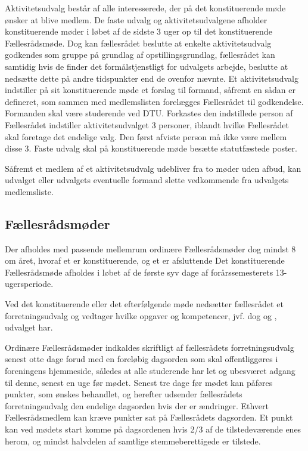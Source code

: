 \begin{list}
\item Aktivitetsudvalg består af alle interesserede, der på det konstituerende møde ønsker at blive medlem. De faste udvalg og aktivitetsudvalgene afholder konstituerende møder i løbet af de sidste 3 uger op til det konstituerende Fællesrådsmøde. Dog kan fællesrådet beslutte at enkelte aktivitetsudvalg godkendes som gruppe på grundlag af opstillingsgrundlag, fællesrådet kan samtidig hvis de finder det formålstjenstligt for udvalgets arbejde, beslutte at nedsætte dette på andre tidspunkter end de ovenfor nævnte. Et aktivitetsudvalg indstiller på sit konstituerende møde et forslag til formand, såfremt en sådan er defineret, som sammen med medlemslisten forelægges Fællesrådet til godkendelse. Formanden skal være studerende ved DTU. Forkastes den indstillede person af Fællesrådet indstiller aktivitetsudvalget 3 personer, iblandt hvilke Fællesrådet skal foretage det endelige valg. Den først afviste person må ikke være mellem disse 3. Faste udvalg skal på konstituerende møde besætte statutfæstede poster.

\item  Såfremt et medlem af et aktivitetsudvalg udebliver fra to møder uden afbud, kan udvalget eller udvalgets eventuelle formand slette vedkommende fra udvalgets medlemsliste.


\subsection{Fællesrådsmøder}
\label{S:kap:FRmoeder}
\item Der afholdes med passende mellemrum ordinære Fællesrådsmøder dog mindst 8 om året, hvoraf et er konstituerende, og et er afsluttende Det konstituerende Fællesrådsmøde afholdes i løbet af de første syv dage af forårssemesterets 13-ugersperiode.

\item  Ved det konstituerende eller det efterfølgende møde nedsætter fællesrådet et forretningsudvalg og vedtager hvilke opgaver og kompetencer, jvf. dog  og , udvalget har.

\item  \label{S:FRmoeder:indkaldelse} Ordinære Fællesrådsmøder indkaldes skriftligt af fællesrådets forretningsudvalg senest otte dage forud med en foreløbig dagsorden som skal offentliggøres i foreningens hjemmeside, således at alle studerende har let og ubesværet adgang til denne, senest en uge før mødet. Senest tre dage før mødet kan påføres punkter, som ønskes behandlet, og herefter udsender fællesrådets forretningsudvalg den endelige dagsorden hvis der er ændringer. Ethvert Fællesrådsmedlem kan kræve punkter sat på Fællesrådets dagsorden. Et punkt kan ved mødets start komme på dagsordenen hvis 2/3 af de tilstedeværende enes herom, og mindst halvdelen af samtlige stemmeberettigede er tilstede.                                     
                             

\end{list}
